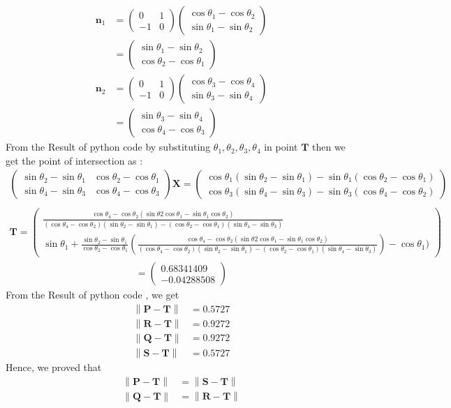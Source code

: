 \documentclass[10pt]{article}
\providecommand{\norm}[1]{\left\lVert#1\right\rVert}
\newcommand{\myvec}[1]{\ensuremath{\begin{pmatrix}#1\end{pmatrix}}}
\let\vec\mathbf
\begin{document}
\begin{enumerate}
\begin{align}
\vec{n}_1&=\myvec{0&1\\-1&0}\myvec{\cos \theta_1-\cos \theta_2\\\sin \theta_1-\sin \theta_2}\\
&=\myvec{\sin \theta_1-\sin \theta_2\\\cos \theta_2-\cos \theta_1}\\
\vec{n}_2&=\myvec{0&1\\-1&0}\myvec{\cos\theta_3-\cos \theta_4\\\sin \theta_3-\sin \theta_4}\\
&=\myvec{\sin \theta_3-\sin \theta_4\\\cos \theta_4-\cos \theta_3}
\end{align}
From the Result of python code by substituting $\theta_1,\theta_2,\theta_3,\theta_4$ in point $\vec{T}$ then we get the point of intersection as :
\begin{multline}
\myvec{\sin \theta_2-\sin \theta_1&\cos \theta_2-\cos \theta_1\\\sin \theta_4-\sin \theta_3&\cos \theta_4-\cos \theta_3}\vec{X}=\myvec{\cos \theta_1(\sin \theta_2-\sin \theta_1)-\sin \theta_1(\cos \theta_2-\cos \theta_1)\\\cos \theta_3(\sin \theta_4-\sin \theta_3)-\sin \theta_3(\cos \theta_4-\cos \theta_2)}\\
\end{multline}
\begin{multline}
\vec{T}=\myvec{\frac{\cos \theta_4-\cos \theta_2(\sin \theta2 \cos \theta_1-\sin \theta_1 \cos \theta_2)}{(\cos\theta_4-\cos \theta_2)(\sin \theta_2-\sin \theta_1)-(\cos \theta_2-\cos \theta_1)(\sin \theta_4-\sin \theta_3)}\\[8pt]\sin \theta_1+\frac{\sin \theta_2-\sin \theta_1}{\cos \theta_2-\cos \theta_1}(\frac{\cos \theta_4-\cos \theta_2(\sin \theta2\cos \theta_1-\sin \theta_1\cos \theta_2)}{(\cos \theta_4-\cos \theta_2)(\sin \theta_2-\sin \theta_1)-(\cos \theta_2-\cos \theta_1)(\sin \theta_4-\sin \theta_3)})-\cos \theta_1)}
\end{multline} 	
\begin{align}
=\myvec{0.68341409\\-0.04288508}
\end{align}
From the Result of python code , we get
\begin{align}
\norm{\vec{P}-\vec{T}}&=0.5727\\
\norm{\vec{R}-\vec{T}}&=0.9272\\
\norm{\vec{Q}-\vec{T}}&=0.9272\\
\norm{\vec{S}-\vec{T}}&=0.5727
\end{align}
Hence, we proved that
\begin{align}
\norm{\vec{P}-\vec{T}}&=\norm{\vec{S}-\vec{T}}\\
\norm{\vec{Q}-\vec{T}}&=\norm{\vec{R}-\vec{T}}
\end{align} 
\end{enumerate}
\end{document}
